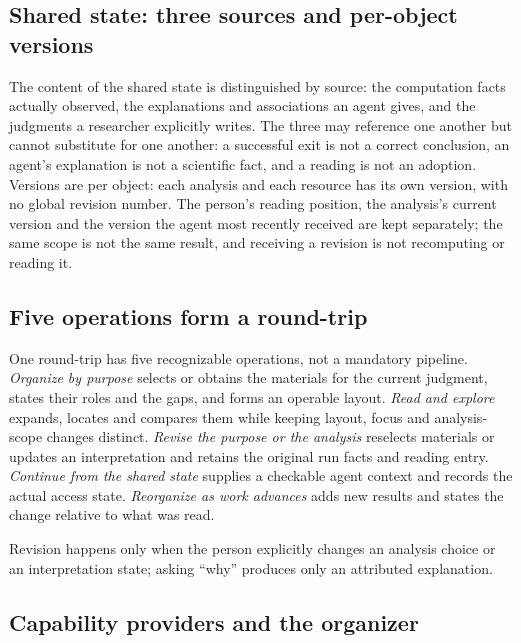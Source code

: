 \documentclass[11pt]{article}
\begin{document}
\subsection{Shared state: three sources and per-object versions}\label{shared-state}

The content of the shared state is distinguished by source: the computation facts actually observed, the explanations and associations an agent gives, and the judgments a researcher explicitly writes. The three may reference one another but cannot substitute for one another: a successful exit is not a correct conclusion, an agent's explanation is not a scientific fact, and a reading is not an adoption. Versions are per object: each analysis and each resource has its own version, with no global revision number. The person's reading position, the analysis's current version and the version the agent most recently received are kept separately; the same scope is not the same result, and receiving a revision is not recomputing or reading it.

\subsection{Five operations form a round-trip}\label{five-ops}

One round-trip has five recognizable operations, not a mandatory pipeline. \emph{Organize by purpose} selects or obtains the materials for the current judgment, states their roles and the gaps, and forms an operable layout. \emph{Read and explore} expands, locates and compares them while keeping layout, focus and analysis-scope changes distinct. \emph{Revise the purpose or the analysis} reselects materials or updates an interpretation and retains the original run facts and reading entry. \emph{Continue from the shared state} supplies a checkable agent context and records the actual access state. \emph{Reorganize as work advances} adds new results and states the change relative to what was read.

Revision happens only when the person explicitly changes an analysis choice or an interpretation state; asking ``why'' produces only an attributed explanation.

\subsection{Capability providers and the organizer}\label{capability}
\end{document}
